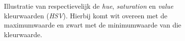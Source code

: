\documentclass[a4paper,kulak]{kulakarticle}
\begin{document}
	\begin{figure}[H]
		\centering
		\qquad
		\qquad
		
		\caption{Illustratie van respectievelijk de \textit{hue}, \textit{saturation} en \textit{value} kleurwaarden (\textit{HSV}). Hierbij komt wit overeen met de maximumwaarde en zwart met de minimumwaarde van die kleurwaarde.}
		\label{figuur HSV}
	\end{figure}
\end{document}
